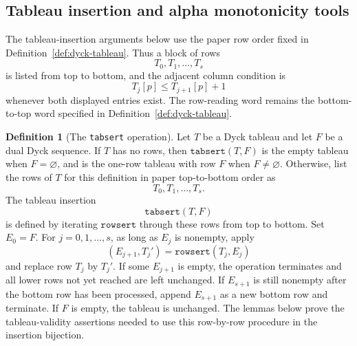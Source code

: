 \documentclass[11pt]{article}
\theoremstyle{plain}
\theoremstyle{definition}
\newtheorem{definition}[theorem]{Definition}
\theoremstyle{remark}
\newcommand{\rowsert}{\texttt{rowsert}}
\begin{document}
\subsection{Tableau insertion and alpha monotonicity tools}
The tableau-insertion arguments below use the paper row order fixed in
Definition~\ref{def:dyck-tableau}.  Thus a block of rows
\[
  T_0,T_1,\ldots,T_s
\]
is listed from top to bottom, and the adjacent column condition is
\[
  T_j[p]\le T_{j+1}[p]+1
\]
whenever both displayed entries exist.  The row-reading word remains the
bottom-to-top word specified in Definition~\ref{def:dyck-tableau}.
\begin{definition}[The \texttt{tabsert} operation]
\label{def:tabsert}
Let \(T\) be a Dyck tableau and let \(F\) be a dual Dyck sequence.  If \(T\) has
no rows, then \(\texttt{tabsert}(T,F)\) is the empty tableau when
\(F=\varnothing\), and is the one-row tableau with row \(F\) when
\(F\ne\varnothing\).  Otherwise, list the rows of \(T\) for this definition in
paper top-to-bottom order as
\[
  T_0,T_1,\ldots,T_s.
\]
The tableau insertion
\[
  \texttt{tabsert}(T,F)
\]
is defined by iterating \(\rowsert\) through these rows from top to bottom.
Set \(E_0=F\).  For \(j=0,1,\ldots,s\), as long as \(E_j\) is nonempty, apply
\[
  (E_{j+1},T_j')=\rowsert(T_j,E_j)
\]
and replace row \(T_j\) by \(T_j'\).  If some \(E_{j+1}\) is empty, the
operation terminates and all lower rows not yet reached are left unchanged.  If
\(E_{s+1}\) is still nonempty after the bottom row has been processed, append
\(E_{s+1}\) as a new bottom row and terminate.  If \(F\) is empty, the tableau
is unchanged.
The lemmas below prove the tableau-validity assertions needed to use this
row-by-row procedure in the insertion bijection.
\end{definition}
\end{document}
